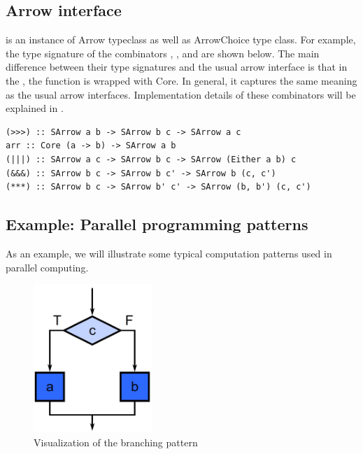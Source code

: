 \subsection{Arrow interface}
 is an instance of Arrow typeclass as well as ArrowChoice type class. For example, the type signature of the combinators \hask{>>>}, \hask{|||}, \hask{&&&} and  are shown below. The main difference between their type signatures and the usual arrow interface is that in the , the function is wrapped with Core. In general, it captures the same meaning as the usual arrow interfaces. Implementation details of these combinators will be explained in .
\begin{code}
\begin{verbatim}
(>>>) :: SArrow a b -> SArrow b c -> SArrow a c
arr :: Core (a -> b) -> SArrow a b
(|||) :: SArrow a c -> SArrow b c -> SArrow (Either a b) c
(&&&) :: SArrow b c -> SArrow b c' -> SArrow b (c, c')
(***) :: SArrow b c -> SArrow b' c' -> SArrow (b, b') (c, c')
\end{verbatim}
\end{code}
\subsection{Example: Parallel programming patterns}
As an example, we will illustrate some typical computation patterns used in parallel computing.
\begin{figure}[ht]
    \centering
    \includegraphics[width=0.4\textwidth]{arrow/select.png}
    \caption{Visualization of the branching pattern \cite{mccoolStructuredParallelPrograming2012}}
    \label{SArrow:fig:select}
\end{figure}

